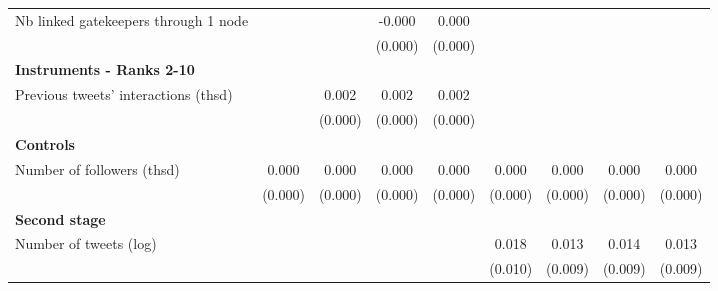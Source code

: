 {\begin{tabular}{l*{8}{c}}
Nb linked gatekeepers through 1 node&                     &                     &      -0.000         &       0.000         &                     &                     &                     &                     \\
                    &                     &                     &     (0.000)         &     (0.000)         &                     &                     &                     &                     \\
\textbf{Instruments - Ranks 2-10}&                     &                     &                     &                     &                     &                     &                     &                     \\
Previous tweets' interactions (thsd)&                     &       0.002\sym{***}&       0.002\sym{***}&       0.002\sym{***}&                     &                     &                     &                     \\
                    &                     &     (0.000)         &     (0.000)         &     (0.000)         &                     &                     &                     &                     \\
\textbf{Controls}   &                     &                     &                     &                     &                     &                     &                     &                     \\
Number of followers (thsd)&       0.000         &       0.000         &       0.000         &       0.000         &       0.000         &       0.000         &       0.000         &       0.000         \\
                    &     (0.000)         &     (0.000)         &     (0.000)         &     (0.000)         &     (0.000)         &     (0.000)         &     (0.000)         &     (0.000)         \\
\textbf{Second stage}&                     &                     &                     &                     &                     &                     &                     &                     \\
Number of tweets (log)&                     &                     &                     &                     &       0.018\sym{*}  &       0.013         &       0.014         &       0.013         \\
                    &                     &                     &                     &                     &     (0.010)         &     (0.009)         &     (0.009)         &     (0.009)         \\

\end{tabular}}
